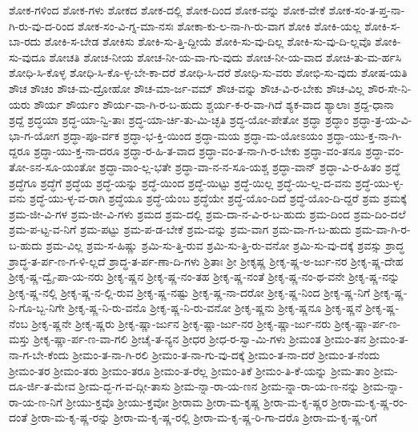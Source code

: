 {ಶೋಕ-ಗಳಿಂದ
ಶೋಕ-ಗಳು
ಶೋಕದ
ಶೋಕ-ದಲ್ಲಿ
ಶೋಕ-ದಿಂದ
ಶೋಕ-ವನ್ನು
ಶೋಕ-ವೇಕೆ
ಶೋಕ-ಸಂ-ತ-ಪ್ತ-ನಾ-ಗಿ-ರು-ವು-ದ-ರಿಂದ
ಶೋಕ-ಸಂ-ವಿ-ಗ್ನ-ಮಾ-ನಸಃ
ಶೋಕಾ-ಕು-ಲ-ನಾ-ಗಿ-ರು-ವಾಗ
ಶೋಕಿ
ಶೋಕಿ-ಯಲ್ಲ
ಶೋಕಿ-ಸ-ಬಾ-ರದು
ಶೋಕಿ-ಸ-ಬೇಡ
ಶೋಕಿಸು
ಶೋಕಿ-ಸು-ತ್ತಿ-ದ್ದೀಯೆ
ಶೋಕಿ-ಸು-ವು-ದಿಲ್ಲ
ಶೋಕಿ-ಸು-ವು-ದಿ-ಲ್ಲವೊ
ಶೋಕಿ-ಸು-ವುದೂ
ಶೋಚತಿ
ಶೋಚ-ನೀಯ
ಶೋಚ-ನೀ-ಯ-ವಾ-ಗು-ವುದು
ಶೋಚ-ನೀ-ಯ-ವಾದ
ಶೋಚಿ-ತು-ಮ-ರ್ಹಸಿ
ಶೋಧಿ-ಸಿ-ಕೊಳ್ಳ
ಶೋಧಿ-ಸಿ-ಕೊ-ಳ್ಳ-ಬೇ-ಕಾ-ದರೆ
ಶೋಧಿ-ಸಿ-ದರೆ
ಶೋಧಿ-ಸು-ವರು
ಶೋಭಿ-ಸು-ವುದು
ಶೋಷ-ಯತಿ
ಶೌಚ
ಶೌಚಂ
ಶೌಚ-ಮ-ದ್ರೋಹೋ
ಶೌಚ-ಮಾ-ರ್ಜ-ವಮ್
ಶೌಚ-ವನ್ನು
ಶೌಚ-ವಿ-ರ-ಬೇಕು
ಶೌಚ-ವಿಲ್ಲ
ಶೌರ-ಸೇ-ನಿ-ಯರು
ಶೌರ್ಯ
ಶೌರ್ಯಂ
ಶೌರ್ಯ-ವಾ-ಗಿ-ರ-ಬ-ಹುದು
ಶ್ಚರ್ಯ-ಕ-ರ-ವಾ-ಗಿದೆ
ಶ್ಯಕ-ವಾದ
ಶ್ಯಾಲಾಃ
ಶ್ರದ್ದ-ಧಾನಾ
ಶ್ರದ್ದೆ
ಶ್ರದ್ಧಯಾ
ಶ್ರದ್ಧ-ಯಾ-ನ್ವಿ-ತಾಃ
ಶ್ರದ್ಧ-ಯಾ-ರ್ಚಿ-ತು-ಮಿ-ಚ್ಛತಿ
ಶ್ರದ್ಧ-ಯೋ-ಪೇತೋ
ಶ್ರದ್ಧಾ
ಶ್ರದ್ಧಾಂ
ಶ್ರದ್ಧಾ-ತ್ರ-ಯ-ವಿ-ಭಾ-ಗ-ಯೋಗ
ಶ್ರದ್ಧಾ-ಪೂ-ರ್ವಕ
ಶ್ರದ್ಧಾ-ಭ-ಕ್ತಿ-ಯಿಂದ
ಶ್ರದ್ಧಾ-ಮಯ
ಶ್ರದ್ಧಾ-ಮ-ಯೋಽಯಂ
ಶ್ರದ್ಧಾ-ಯು-ಕ್ತ-ನಾ-ಗಿ-ದ್ದರೂ
ಶ್ರದ್ಧಾ-ಯು-ಕ್ತ-ನಾ-ದರೂ
ಶ್ರದ್ಧಾ-ರ-ಹಿ-ತ-ವಾದ
ಶ್ರದ್ಧಾ-ವಂ-ತ-ನಾ-ಗಿ-ರ-ಬೇಕು
ಶ್ರದ್ಧಾ-ವಂ-ತನೂ
ಶ್ರದ್ಧಾ-ವಂ-ತೋ-ಽನ-ಸೂ-ಯಂತೋ
ಶ್ರದ್ಧಾ-ವಾಂ-ಲ್ಲ-ಭತೇ
ಶ್ರದ್ಧಾ-ವಾ-ನ-ನ-ಸೂ-ಯಶ್ಚ
ಶ್ರದ್ಧಾ-ವಾನ್
ಶ್ರದ್ಧಾ-ವಿ-ರ-ಹಿತಂ
ಶ್ರದ್ಧೆ
ಶ್ರದ್ಧೆಗೂ
ಶ್ರದ್ಧೆಗೆ
ಶ್ರದ್ಧೆಯ
ಶ್ರದ್ಧೆ-ಯನ್ನು
ಶ್ರದ್ಧೆ-ಯಿಂದ
ಶ್ರದ್ಧೆ-ಯಿಟ್ಟು
ಶ್ರದ್ಧೆ-ಯಿಲ್ಲ
ಶ್ರದ್ಧೆ-ಯಿ-ಲ್ಲ-ದ-ವನು
ಶ್ರದ್ಧೆ-ಯು-ಳ್ಳ-ವನು
ಶ್ರದ್ಧೆ-ಯು-ಳ್ಳ-ವ-ರಾಗಿ
ಶ್ರದ್ಧೆಯೂ
ಶ್ರದ್ಧೆ-ಯೆಂಬ
ಶ್ರದ್ಧೆಯೇ
ಶ್ರದ್ಧೆ-ಯೊಂ-ದಿದೆ
ಶ್ರದ್ಧೆ-ಯೊಂ-ದಿ-ದ್ದರೆ
ಶ್ರಮ
ಶ್ರಮಕ್ಕೆ
ಶ್ರಮ-ಜೀ-ವಿ-ಗಳ
ಶ್ರಮ-ಜೀ-ವಿ-ಗಳು
ಶ್ರಮದ
ಶ್ರಮ-ದಲ್ಲಿ
ಶ್ರಮ-ದಾ-ನ-ವಿ-ರ-ಬ-ಹುದು
ಶ್ರಮ-ದಿಂದ
ಶ್ರಮ-ದಿಂ-ದಲೆ
ಶ್ರಮ-ಪ-ಟ್ಟ-ವ-ನಿಗೆ
ಶ್ರಮ-ಪಟ್ಟು
ಶ್ರಮ-ಪ-ಡ-ಬೇಕೆ
ಶ್ರಮ-ವನ್ನು
ಶ್ರಮ-ವಾಗ
ಶ್ರಮ-ವಾ-ಗ-ಬ-ಹುದು
ಶ್ರಮ-ವಾ-ಗಿ-ರ-ಬ-ಹುದು
ಶ್ರಮ-ವಿಲ್ಲ
ಶ್ರಮ-ಸ-ಹಿಷ್ಣು
ಶ್ರಮಿ-ಸು-ತ್ತಿ-ರುವ
ಶ್ರಮಿ-ಸು-ತ್ತಿ-ರು-ವನೋ
ಶ್ರಮಿ-ಸು-ವು-ದಕ್ಕೆ
ಶ್ರವಸ್ಸು
ಶ್ರಾದ್ಧ
ಶ್ರಾದ್ಧ-ತ-ರ್ಪ-ಣ-ಗ-ಳಿ-ಲ್ಲದೆ
ಶ್ರಾದ್ಧ-ತ-ರ್ಪ-ಣಾ-ದಿ-ಗಳು
ಶ್ರಿತಾಃ
ಶ್ರೀ
ಶ್ರೀಕೃಷ್ಣ
ಶ್ರೀಕೃ-ಷ್ಣ-ಅ-ರ್ಜು-ನರ
ಶ್ರೀಕೃ-ಷ್ಣ-ದೇಹ
ಶ್ರೀಕೃ-ಷ್ಣ-ದ್ವೈ-ಪಾ-ಯ-ನರು
ಶ್ರೀಕೃ-ಷ್ಣನ
ಶ್ರೀಕೃ-ಷ್ಣ-ನಂ-ತಹ
ಶ್ರೀಕೃ-ಷ್ಣ-ನಂತೆ
ಶ್ರೀಕೃ-ಷ್ಣ-ನಂ-ಥ-ವನೇ
ಶ್ರೀಕೃ-ಷ್ಣ-ನನ್ನು
ಶ್ರೀಕೃ-ಷ್ಣ-ನಲ್ಲಿ
ಶ್ರೀಕೃ-ಷ್ಣ-ನ-ಲ್ಲಿ-ರುವ
ಶ್ರೀಕೃ-ಷ್ಣ-ನಷ್ಟು
ಶ್ರೀಕೃ-ಷ್ಣ-ನಾ-ದರೋ
ಶ್ರೀಕೃ-ಷ್ಣ-ನಿಂದ
ಶ್ರೀಕೃ-ಷ್ಣ-ನಿಗೆ
ಶ್ರೀಕೃ-ಷ್ಣ-ನಿ-ಗೊ-ಬ್ಬ-ನಿಗೇ
ಶ್ರೀಕೃ-ಷ್ಣ-ನಿ-ರು-ವನೊ
ಶ್ರೀಕೃ-ಷ್ಣ-ನಿ-ರು-ವನೋ
ಶ್ರೀಕೃ-ಷ್ಣನು
ಶ್ರೀಕೃ-ಷ್ಣನೂ
ಶ್ರೀಕೃ-ಷ್ಣನೆ
ಶ್ರೀಕೃ-ಷ್ಣ-ನೆಂಬ
ಶ್ರೀಕೃ-ಷ್ಣನೇ
ಶ್ರೀಕೃ-ಷ್ಣರು
ಶ್ರೀಕೃ-ಷ್ಣಾ-ರ್ಜುನ
ಶ್ರೀಕೃ-ಷ್ಣಾ-ರ್ಜು-ನರ
ಶ್ರೀಕೃ-ಷ್ಣಾ-ರ್ಜು-ನರು
ಶ್ರೀಕೃ-ಷ್ಣಾ-ರ್ಪ-ಣ-ಮಸ್ತು
ಶ್ರೀಕೃ-ಷ್ಣಾ-ರ್ಪ-ಣ-ವಾ-ಗಲಿ
ಶ್ರೀಚೈ-ತ-ನ್ಯನ
ಶ್ರೀಧರ
ಶ್ರೀಧ-ರ-ಸ್ವಾ-ಮಿ-ಗಳು
ಶ್ರೀಮಂತ
ಶ್ರೀಮಂ-ತನ
ಶ್ರೀಮಂ-ತ-ನಾ-ಗ-ಬೇ-ಕೆಂದು
ಶ್ರೀಮಂ-ತ-ನಾ-ಗಿ-ರಲಿ
ಶ್ರೀಮಂ-ತ-ನಾ-ಗು-ವು-ದಕ್ಕೆ
ಶ್ರೀಮಂ-ತ-ನಾ-ದರೆ
ಶ್ರೀಮಂ-ತ-ನೆಂದು
ಶ್ರೀಮಂ-ತರ
ಶ್ರೀಮಂ-ತರು
ಶ್ರೀಮಂ-ತರೂ
ಶ್ರೀಮಂ-ತ-ರೆಲ್ಲ
ಶ್ರೀಮಂ-ತಿಕೆ
ಶ್ರೀಮಂ-ತಿ-ಕೆ-ಯನ್ನು
ಶ್ರೀಮ-ತಾಂ
ಶ್ರೀಮ-ದೂ-ರ್ಜಿ-ತ-ಮೇವ
ಶ್ರೀಮ-ದ್ಭ-ಗ-ವ-ದ್ಗೀ-ತಾಸು
ಶ್ರೀಮ-ನ್ನಾ-ರಾ-ಯ-ಣನ
ಶ್ರೀಮ-ನ್ನಾ-ರಾ-ಯ-ಣ-ನನ್ನು
ಶ್ರೀಮ-ನ್ನಾ-ರಾ-ಯ-ಣ-ನಿಗೆ
ಶ್ರೀಯು-ಕ್ತವೊ
ಶ್ರೀಯು-ಕ್ತವೋ
ಶ್ರೀರಾಮ
ಶ್ರೀರಾ-ಮ-ಕೃಷ್ಣ
ಶ್ರೀರಾ-ಮ-ಕೃ-ಷ್ಣರ
ಶ್ರೀರಾ-ಮ-ಕೃ-ಷ್ಣ-ರಂ-ದಂತೆ
ಶ್ರೀರಾ-ಮ-ಕೃ-ಷ್ಣ-ರನ್ನು
ಶ್ರೀರಾ-ಮ-ಕೃ-ಷ್ಣ-ರಲ್ಲಿ
ಶ್ರೀರಾ-ಮ-ಕೃ-ಷ್ಣ-ರಿ-ಗಾ-ದರೊ
ಶ್ರೀರಾ-ಮ-ಕೃ-ಷ್ಣ-ರಿಗೆ
}
